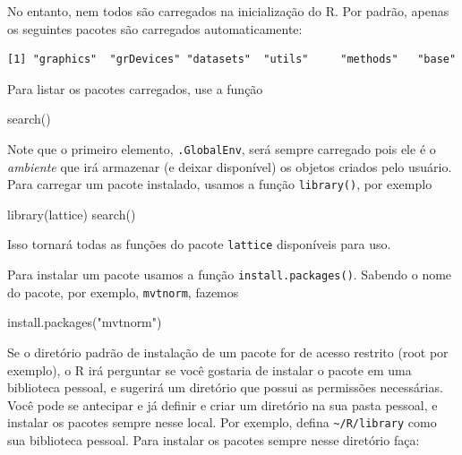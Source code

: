 \documentclass[
  10pt,
  a4paper]{book}
\newenvironment{Shaded}{\begin{snugshade}}{\end{snugshade}}
\newcommand{\FunctionTok}[1]{\textcolor[rgb]{0.00,0.00,0.00}{#1}}
\newcommand{\NormalTok}[1]{#1}
\newcommand{\StringTok}[1]{\textcolor[rgb]{0.31,0.60,0.02}{#1}}
\begin{document}
No entanto, nem todos são carregados na inicialização do R. Por padrão,
apenas os seguintes pacotes são carregados automaticamente:

\begin{verbatim}
[1] "graphics"  "grDevices" "datasets"  "utils"     "methods"   "base"     
\end{verbatim}

Para listar os pacotes carregados, use a função

\begin{Shaded}
\begin{Highlighting}[]
\FunctionTok{search}\NormalTok{()}
\end{Highlighting}
\end{Shaded}

Note que o primeiro elemento, \texttt{.GlobalEnv}, será sempre carregado pois
ele é o \emph{ambiente} que irá armazenar (e deixar disponível) os objetos
criados pelo usuário. Para carregar um pacote instalado, usamos a função
\texttt{library()}, por exemplo

\begin{Shaded}
\begin{Highlighting}[]
\FunctionTok{library}\NormalTok{(lattice)}
\FunctionTok{search}\NormalTok{()}
\end{Highlighting}
\end{Shaded}

Isso tornará todas as funções do pacote \texttt{lattice} disponíveis para uso.

Para instalar um pacote usamos a função \texttt{install.packages()}. Sabendo o
nome do pacote, por exemplo, \texttt{mvtnorm}, fazemos

\begin{Shaded}
\begin{Highlighting}[]
\FunctionTok{install.packages}\NormalTok{(}\StringTok{"mvtnorm"}\NormalTok{)}
\end{Highlighting}
\end{Shaded}

Se o diretório padrão de instalação de um pacote for de acesso restrito
(root por exemplo), o R irá perguntar se você gostaria de instalar o
pacote em uma biblioteca pessoal, e sugerirá um diretório que possui as
permissões necessárias. Você pode se antecipar e já definir e criar um
diretório na sua pasta pessoal, e instalar os pacotes sempre nesse
local. Por exemplo, defina \texttt{\textasciitilde{}/R/library} como sua biblioteca pessoal.
Para instalar os pacotes sempre nesse diretório faça:
\end{document}
